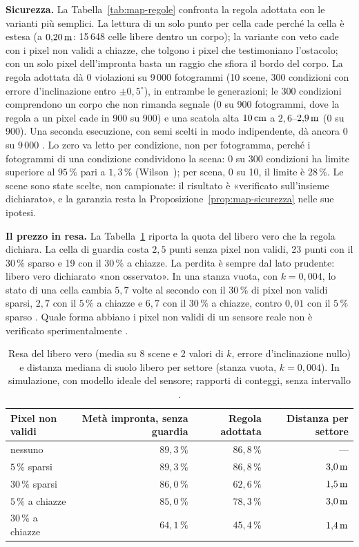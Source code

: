 \textbf{Sicurezza.} La Tabella~\ref{tab:map-regole} confronta la regola adottata con le varianti più semplici. La lettura di un solo punto per cella cade perché la cella è estesa (a $0{,}20\,\mathrm{m}$: 15\,648 celle libere dentro un corpo); la variante con veto cade con i pixel non validi a chiazze, che tolgono i pixel che testimoniano l'ostacolo; con un solo pixel dell'impronta basta un raggio che sfiora il bordo del corpo. La regola adottata dà 0 violazioni su 9\,000 fotogrammi (10 scene, 300 condizioni con errore d'inclinazione entro $\pm0{,}5^\circ$), in entrambe le generazioni; le 300 condizioni comprendono un corpo che non rimanda segnale (0 su 900 fotogrammi, dove la regola a un pixel cade in 900 su 900) e una scatola alta $10\,\mathrm{cm}$ a $2{,}6$–$2{,}9\,\mathrm{m}$ (0 su 900). Una seconda esecuzione, con semi scelti in modo indipendente, dà ancora 0 su 9\,000 . Lo zero va letto per condizione, non per fotogramma, perché i fotogrammi di una condizione condividono la scena: 0 su 300 condizioni ha limite superiore al $95\,\%$ pari a $1{,}3\,\%$ (Wilson~\cite{wilson1927}); per scena, 0 su 10, il limite è $28\,\%$. Le scene sono state scelte, non campionate: il risultato è «verificato sull'insieme dichiarato», e la garanzia resta la Proposizione~\ref{prop:map-sicurezza} nelle sue ipotesi.

\textbf{Il prezzo in resa.} La Tabella~\ref{tab:map-resa} riporta la quota del libero vero che la regola dichiara. La cella di guardia costa $2{,}5$ punti senza pixel non validi, 23 punti con il $30\,\%$ sparso e 19 con il $30\,\%$ a chiazze. La perdita è sempre dal lato prudente: libero vero dichiarato «non osservato». In una stanza vuota, con $k=0{,}004$, lo stato di una cella cambia $5{,}7$ volte al secondo con il $30\,\%$ di pixel non validi sparsi, $2{,}7$ con il $5\,\%$ a chiazze e $6{,}7$ con il $30\,\%$ a chiazze, contro $0{,}01$ con il $5\,\%$ sparso . Quale forma abbiano i pixel non validi di un sensore reale non è verificato sperimentalmente .

\begin{table}[t]\centering\small
\caption{Resa del libero vero (media su 8 scene e 2 valori di $k$, errore d'inclinazione nullo) e distanza mediana di suolo libero per settore (stanza vuota, $k=0{,}004$). In simulazione, con modello ideale del sensore; rapporti di conteggi, senza intervallo .}\label{tab:map-resa}
\begin{tabular}{lrrr}
\toprule
Pixel non validi & Metà impronta, senza guardia & Regola adottata & Distanza per settore\\
\midrule
nessuno & $89{,}3\,\%$ & $86{,}8\,\%$ & —\\
$5\,\%$ sparsi & $89{,}3\,\%$ & $86{,}8\,\%$ & $3{,}0\,\mathrm{m}$\\
$30\,\%$ sparsi & $86{,}0\,\%$ & $62{,}6\,\%$ & $1{,}5\,\mathrm{m}$\\
$5\,\%$ a chiazze & $85{,}0\,\%$ & $78{,}3\,\%$ & $3{,}0\,\mathrm{m}$\\
$30\,\%$ a chiazze & $64{,}1\,\%$ & $45{,}4\,\%$ & $1{,}4\,\mathrm{m}$\\
\bottomrule
\end{tabular}
\end{table}

